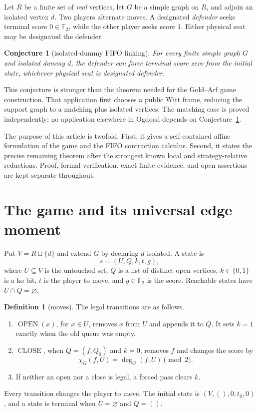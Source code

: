 \documentclass[11pt]{article}
\newtheorem{conjecture}[theorem]{Conjecture}
\theoremstyle{definition}
\newtheorem{definition}[theorem]{Definition}
\theoremstyle{remark}
\begin{document}
Let $R$ be a finite set of \emph{real} vertices, let $G$ be a simple graph
on $R$, and adjoin an isolated vertex $d$.  Two players alternate moves.  A
designated \emph{defender} seeks terminal score $0\in\mathbb F_2$, while the
other player seeks score $1$.  Either physical seat may be designated the
defender.

\begin{conjecture}[isolated-dummy FIFO linking]\label{conj:fifo}
For every finite simple graph $G$ and isolated dummy $d$, the defender can
force terminal score zero from the initial state, whichever physical seat is
designated defender.
\end{conjecture}

This conjecture is stronger than the theorem needed for the Gold--Arf game
construction.  That application first chooses a public Witt frame, reducing
the support graph to a matching plus isolated vertices.  The matching case is
proved independently; no application elsewhere in Ogdoad depends on
Conjecture~\ref{conj:fifo}.

The purpose of this article is twofold.  First, it gives a self-contained
affine formulation of the game and the FIFO contraction calculus.  Second,
it states the precise remaining theorem after the strongest known local and
strategy-relative reductions.  Proof, formal verification, exact finite
evidence, and open assertions are kept separate throughout.

\section{The game and its universal edge moment}\label{sec:game}

Put $V=R\sqcup\{d\}$ and extend $G$ by declaring $d$ isolated.  A state is
\[
  s=(U,Q,k,t,g),
\]
where $U\subseteq V$ is the untouched set, $Q$ is a list of distinct open
vertices, $k\in\{0,1\}$ is a ko bit, $t$ is the player to move, and
$g\in\mathbb F_2$ is the score.  Reachable states have $U\cap Q=\varnothing$.

\begin{definition}[moves]\label{def:moves}
The legal transitions are as follows.
\begin{enumerate}
\item $\operatorname{OPEN}(x)$, for $x\in U$, removes $x$ from $U$ and
      appends it to $Q$.  It sets $k=1$ exactly when the old queue was empty.
\item $\operatorname{CLOSE}$, when $Q=(f,Q_0)$ and $k=0$, removes $f$ and
      changes the score by
      \[
        \chi_G(f,U)=\deg_G(f,U)\pmod2.
      \]
\item If neither an open nor a close is legal, a forced pass clears $k$.
\end{enumerate}
Every transition changes the player to move.  The initial state is
$(V,(),0,t_0,0)$, and a state is terminal when $U=\varnothing$ and $Q=()$.
\end{definition}
\end{document}
